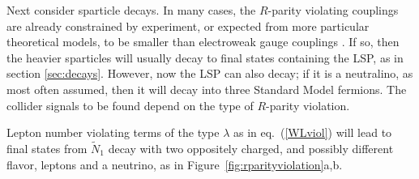 \documentclass[11pt]{article}
\def\stilde{\widetilde}
\begin{document}
Next consider sparticle decays. In many cases, the $R$-parity violating
couplings are already constrained by experiment, or expected from more
particular theoretical models, to be smaller than electroweak gauge
couplings \cite{RPVreviews}. If so, then the heavier sparticles will
usually decay to final states containing the LSP, as in section
\ref{sec:decays}. However, now the LSP can also decay; if it is a
neutralino, as most often assumed, then it will decay into three Standard
Model fermions. The collider signals to be found depend on the type of
$R$-parity violation. 

Lepton number violating terms of the type $\lambda$ as in
eq.~(\ref{WLviol}) will lead to final states from $\stilde N_1$ decay with
two oppositely charged, and possibly different flavor, leptons and a
neutrino, as in Figure~\ref{fig:rparityviolation}a,b. 
\end{document}
